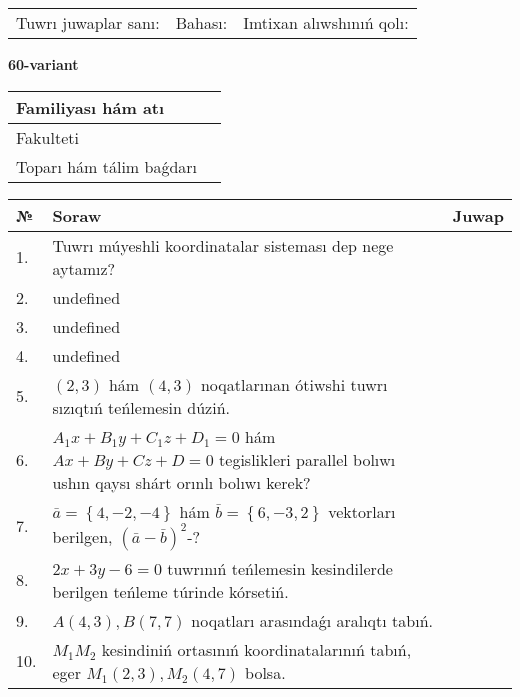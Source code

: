 \documentclass{article}
\begin{document}
\vspace{0.7cm}

\begin{tabular}{lll}
Tuwrı juwaplar sanı: \underline{\hspace{1cm}} & 
Bahası: \underline{\hspace{1cm}} & 
Imtixan alıwshınıń qolı: \underline{\hspace{2cm}} \\
\end{tabular}

\egroup

\newpage


\textbf{60-variant}\\

\bgroup
\def\arraystretch{1.6} %

\begin{tabular}{|m{5.7cm}|m{9.5cm}|}
\hline
Familiyası hám atı & \\
\hline
Fakulteti  & \\
\hline
Toparı hám tálim baǵdarı  & \\
\hline
\end{tabular}

\vspace{0.7cm}

\begin{tabular}{|m{0.7cm}|m{10cm}|m{4cm}|}
\hline
№ & Soraw & Juwap \\
\hline
1. & Tuwrı múyeshli koordinatalar sisteması dep nege aytamız? &  \\
\hline
2. & undefined &  \\
\hline
3. & undefined &  \\
\hline
4. & undefined &  \\
\hline
5. & $(2, 3)$ hám $(4, 3)$ noqatlarınan ótiwshi tuwrı sızıqtıń teńlemesin dúziń. &  \\
\hline
6. & \(A_{1}x + B_{1}y + C_{1}z + D_{1} = 0\) hám \(Ax + By + Cz + D = 0\) tegislikleri parallel bolıwı ushın qaysı shárt orınlı bolıwı kerek? &  \\
\hline
7. & \(\bar{a} = \left\{ 4,- 2,- 4 \right\}\) hám \(\bar{b} = \left\{ 6,- 3, 2 \right\}\) vektorları berilgen, \((\bar{a} - \bar{b}) ^{2}\)-? &  \\
\hline
8. & \(2 x + 3 y - 6 = 0\) tuwrınıń teńlemesin kesindilerde berilgen teńleme túrinde kórsetiń. &  \\
\hline
9. & \(A (4, 3), B (7, 7)\) noqatları arasındaǵı aralıqtı tabıń. &  \\
\hline
10. & \(M_{1}M_{2}\) kesindiniń ortasınıń koordinatalarınıń tabıń, eger \(M_{1} (2, 3), M_{2} (4, 7)\) bolsa. & \\
\hline
\end{tabular}
\end{document}

